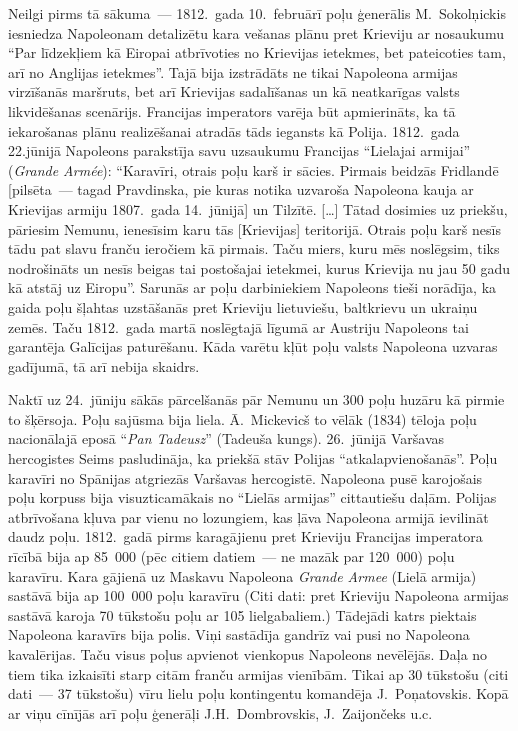 \documentclass[twoside,a5paper,12pt,fleqn,openany]{extbook}
\newcommand{\pltxti}[1]{\textit{\textpolish{#1}}}
\newcommand{\frtxti}[1]{\textit{\textfrench{#1}}}
\newcommand{\citespace}{[\dots{}]}
\begin{document}
Neilgi pirms tā sākuma~--- 1812.~gada 10.~februārī poļu ģenerālis M.~Sokolņickis iesniedza Napoleonam detalizētu kara vešanas plānu pret Krieviju ar nosaukumu ``Par līdzekļiem kā Eiropai atbrīvoties no Krievijas ietekmes, bet pateicoties tam, arī no Anglijas ietekmes''. Tajā bija izstrādāts ne tikai Napoleona armijas virzīšanās maršruts, bet arī Krievijas sadalīšanas un kā neatkarīgas valsts likvidēšanas scenārijs. Francijas imperators varēja būt apmierināts, ka tā iekarošanas plānu realizēšanai atradās tāds iegansts kā Polija. 1812.~gada 22.jūnijā Napoleons parakstīja savu uzsaukumu Francijas ``Lielajai armijai'' (\frtxti{Grande Armée}): ``Karavīri, otrais poļu karš ir sācies. Pirmais beidzās Fridlandē [pilsēta~--- tagad Pravdinska, pie kuras notika uzvaroša Napoleona kauja ar Krievijas armiju 1807.~gada 14.~jūnijā] un Tilzītē. \citespace{} Tātad dosimies uz priekšu, pāriesim Nemunu, ienesīsim karu tās [Krievijas] teritorijā. Otrais poļu karš nesīs tādu pat slavu franču ieročiem kā pirmais. Taču miers, kuru mēs noslēgsim, tiks nodrošināts un nesīs beigas tai postošajai ietekmei, kurus Krievija nu jau 50 gadu kā atstāj uz Eiropu''. Sarunās ar poļu darbiniekiem Napoleons tieši norādīja, ka gaida poļu šļahtas uzstāšanās pret Krieviju lietuviešu, baltkrievu un ukraiņu zemēs. Taču 1812.~gada martā noslēgtajā līgumā ar Austriju Napoleons tai garantēja Galīcijas paturēšanu. Kāda varētu kļūt poļu valsts Napoleona uzvaras gadījumā, tā arī nebija skaidrs.

Naktī uz 24.~jūniju sākās pārcelšanās pār Nemunu un 300 poļu huzāru kā pirmie to šķērsoja. Poļu sajūsma bija liela. Ā.~Mickevicš to vēlāk (1834) tēloja poļu nacionālajā eposā ``\pltxti{Pan Tadeusz}'' (Tadeuša kungs). 26.~jūnijā Varšavas hercogistes Seims pasludināja, ka priekšā stāv Polijas ``atkalapvienošanās''. Poļu karavīri no Spānijas atgriezās Varšavas hercogistē. Napoleona pusē karojošais poļu korpuss bija visuzticamākais no ``Lielās armijas'' cittautiešu daļām. Polijas atbrīvošana kļuva par vienu no lozungiem, kas ļāva Napoleona armijā ievilināt daudz poļu. 1812.~gadā pirms karagājienu pret Krieviju Francijas imperatora rīcībā bija ap 85~000 (pēc citiem datiem~--- ne mazāk par 120~000) poļu karavīru. Kara gājienā uz Maskavu Napoleona \frtxti{Grande Armee} (Lielā armija) sastāvā bija ap 100~000 poļu karavīru (Citi dati: pret Krieviju Napoleona armijas sastāvā karoja 70 tūkstošu poļu ar 105 lielgabaliem.) Tādejādi katrs piektais Napoleona karavīrs bija polis. Viņi sastādīja gandrīz vai pusi no Napoleona kavalērijas. Taču visus poļus apvienot vienkopus Napoleons nevēlējās. Daļa no tiem tika izkaisīti starp citām franču armijas vienībām. Tikai ap 30 tūkstošu (citi dati~--- 37 tūkstošu) vīru lielu poļu kontingentu komandēja J.~Poņatovskis. Kopā ar viņu cīnījās arī poļu ģenerāļi J.H.~Dombrovskis, J.~Zaijončeks u.c.
\end{document}
